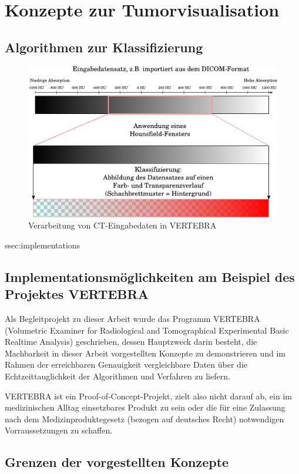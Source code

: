 \documentclass[a4paper,titlepage,12pt]{scrartcl}
\newtheorem[L]{boxedDefinition}{Definition}
\begin{document}
\section{Konzepte zur Tumorvisualisation}\label{ssec:concepts}
\subsection{Algorithmen zur Klassifizierung}
\begin{figure}[p]
\begin{center}
\includegraphics[width=\textwidth]{graphics/Classification.pdf}
\caption{Verarbeitung von CT-Eingabedaten in VERTEBRA}
\label{gradientmapping-graphic}
\end{center}
\end{figure}ssec:implementations
\subsection{Implementationsmöglichkeiten am Beispiel des Projektes VERTEBRA}\label{ssec:implementations}
Als Begleitprojekt zu dieser Arbeit wurde das Programm VERTEBRA (Volumetric Examiner for Radiological and Tomographical Experimental Basic Realtime Analysis) geschrieben, dessen Hauptzweck darin besteht, die Machbarkeit in dieser Arbeit vorgestellten Konzepte zu demonstrieren und im Rahmen der erreichbaren Genauigkeit vergleichbare Daten über die Echtzeittauglichkeit der Algorithmen und Verfahren zu liefern.

VERTEBRA ist ein Proof-of-Concept-Projekt, zielt also nicht darauf ab, ein im medizinischen Alltag einsetzbares Produkt zu sein oder die für eine Zulassung nach dem Medizinproduktegesetz (bezogen auf deutsches Recht) notwendigen Vorraussetzungen zu schaffen.
\subsection{Grenzen der vorgestellten Konzepte}\label{ssec:limits}
\end{document}
